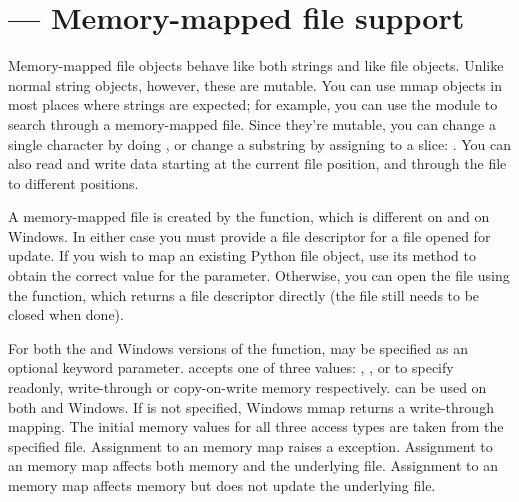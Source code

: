 \section{ ---
Memory-mapped file support}


Memory-mapped file objects behave like both strings and like
file objects.  Unlike normal string objects, however, these are
mutable.  You can use mmap objects in most places where strings
are expected; for example, you can use the  module to
search through a memory-mapped file.  Since they're mutable, you can
change a single character by doing , or
change a substring by assigning to a slice:
.  You can also read and write
data starting at the current file position, and 
through the file to different positions.

A memory-mapped file is created by the  function,
which is different on \UNIX{} and on Windows.  In either case you must
provide a file descriptor for a file opened for update.
If you wish to map an existing Python file object, use its
 method to obtain the correct value for the
 parameter.  Otherwise, you can open the file using the
 function, which returns a file descriptor
directly (the file still needs to be closed when done).

For both the \UNIX{} and Windows versions of the function,
 may be specified as an optional keyword parameter.
 accepts one of three values: ,
, or  to specify
readonly, write-through or copy-on-write memory respectively.
 can be used on both \UNIX{} and Windows.  If
 is not specified, Windows mmap returns a write-through
mapping.  The initial memory values for all three access types are
taken from the specified file.  Assignment to an
 memory map raises a 
exception.  Assignment to an  memory map
affects both memory and the underlying file.  Assignment to an
 memory map affects memory but does not update
the underlying file.

